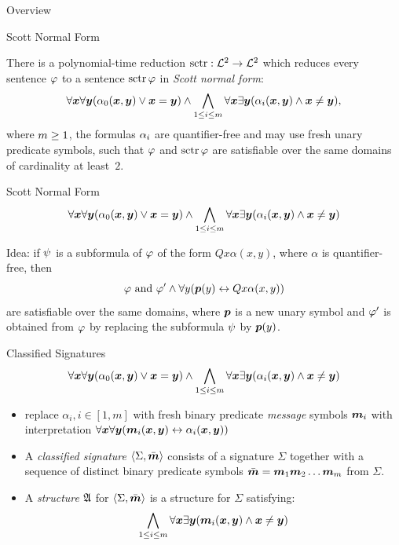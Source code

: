 \documentclass{beamer}
\begin{document}
\begin{frame}{Overview}
\tableofcontents
\end{frame}

\begin{frame}{Scott Normal Form}
\begin{theorem}[Scott, 1962]
There is a polynomial-time reduction $\operatorname{sctr}: \mathcal{L}^{2} \to \mathcal{L}^{2}$ which reduces
every sentence $\varphi$ to a sentence $\operatorname{sctr}\varphi$ in \emph{Scott normal form}:
\[
  \forall\bm{x}\forall\bm{y}(\alpha_{0}(\bm{x},\bm{y}) \lor \bm{x} = \bm{y}) \land
  \bigwedge_{1 \leq i \leq m} \forall\bm{x}\exists\bm{y}
  (\alpha_{i}(\bm{x},\bm{y}) \land \bm{x} \neq \bm{y}),
\]
where $m\geq1$, the formulas $\alpha_{i}$ are quantifier-free and may use
fresh unary predicate symbols, such that $\varphi$ and $\operatorname{sctr}\varphi$ are
satisfiable over the same domains of cardinality at least~$2$.
\end{theorem}
\end{frame}

\begin{frame}{Scott Normal Form}
\[
  \forall\bm{x}\forall\bm{y}(\alpha_{0}(\bm{x},\bm{y}) \lor \bm{x} = \bm{y}) \land
  \bigwedge_{1 \leq i \leq m} \forall\bm{x}\exists\bm{y}
  (\alpha_{i}(\bm{x},\bm{y}) \land \bm{x} \neq \bm{y})
\]

Idea: if $\psi$ is a subformula of $\varphi$ of the form $Q x
\alpha(x,y)$, where $\alpha$ is quantifier-free, then
\[
  \varphi \text{ and } \varphi' \land \forall y(\bm{p}(y)\leftrightarrow Q x \alpha(x,y))
\]
are satisfiable over the same domains, where $\bm{p}$ is a new unary symbol and
$\varphi'$ is obtained from $\varphi$ by replacing the subformula $\psi$ by $\bm{p}(y)$.
\end{frame}

\begin{frame}{Classified Signatures}
\[
  \forall\bm{x}\forall\bm{y}(\alpha_{0}(\bm{x},\bm{y}) \lor \bm{x} = \bm{y}) \land
  \bigwedge_{1 \leq i \leq m} \forall\bm{x}\exists\bm{y}
  (\alpha_{i}(\bm{x},\bm{y}) \land \bm{x} \neq \bm{y})
\]
\begin{itemize}
  \item
  replace $\alpha_i, i\in[1,m]$ with fresh binary predicate \emph{message}
  symbols $\bm{m}_{i}$ with interpretation
  $\forall\bm{x}\forall\bm{y}(\bm{m}_{i}(\bm{x},\bm{y})\leftrightarrow\alpha_i(\bm{x},\bm{y}))$
  
  \item
  A \emph{classified signature} $\left\langle \Sigma,\bar{\bm{m}} \right\rangle$ consists of a signature
  $\Sigma$ together with a sequence of distinct binary predicate symbols $\sms
  = \smm1\smm2\dots\smm\nm$ from $\Sigma$.
  
  \item
  A \emph{structure} $\mathfrak{A}$ for $\left\langle \Sigma,\bar{\bm{m}} \right\rangle$ is a structure for
  $\Sigma$ satisfying:
  \[\bigwedge_{1\leq i\leq m}\forall\bm{x}\exists\bm{y}(\bm{m}_{i}(\bm{x},\bm{y})\land\bm{x}\neq\bm{y})\]
\end{itemize}
\end{frame}
\end{document}
